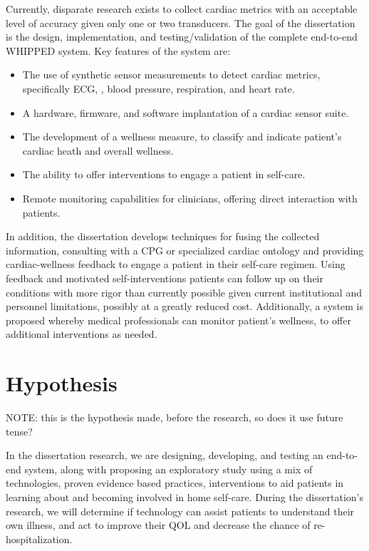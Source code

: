 Currently, disparate research exists to collect cardiac metrics with an acceptable level of accuracy given only one or two transducers. The goal of the dissertation is the design, implementation, and testing/validation of the complete end-to-end WHIPPED system. Key features of the system are:

\begin{itemize}
\item The use of synthetic sensor measurements to detect cardiac metrics, specifically ECG, , blood pressure, respiration, and heart rate.
\item A hardware, firmware, and software implantation of a cardiac sensor suite.
\item The development of a wellness measure, to classify and indicate patient's cardiac heath and overall wellness. \cite{Chaiyasucheeva2012}
\item The ability to offer interventions to engage a patient in self-care.
\item Remote monitoring capabilities for clinicians, offering direct interaction with patients.
\end{itemize}

In addition, the dissertation develops techniques for fusing the collected information, consulting with a CPG or specialized cardiac ontology and providing cardiac-wellness feedback to engage a patient in their self-care regimen. Using feedback and motivated self-interventions patients can follow up on their conditions with more rigor than currently possible given current institutional and personnel limitations, possibly at a greatly reduced cost. Additionally, a system is proposed whereby medical professionals can monitor patient's wellness, to offer additional interventions as needed.

\section{Hypothesis}
\label{sec:Hypothesis} 

NOTE: this is the hypothesis made, before the research, so does it use future tense?

In the dissertation research, we are designing, developing, and testing an end-to-end system, along with proposing an exploratory study using a mix of technologies, proven evidence based practices, interventions to aid patients in learning about and becoming involved in home self-care. During the dissertation's research, we will determine if technology can assist patients to understand their own illness, and act to improve their QOL and decrease the chance of re-hospitalization. 

